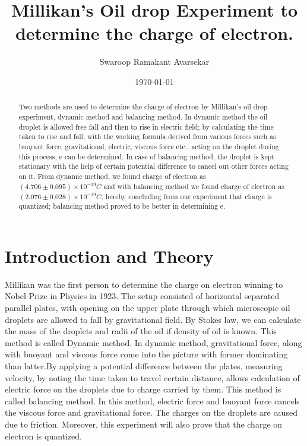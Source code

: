 \documentclass[a4paper, amsfonts, amssymb, amsmath, reprint, showkeys, nofootinbib, twoside]{revtex4-1}
\begin{document}
\title{Millikan's Oil drop Experiment to determine the charge of electron.}
\author{Swaroop Ramakant Avarsekar}
\date{\today}

	
\begin{abstract}
Two methods are used to determine the charge of electron by Millikan's oil drop experiment, dynamic method and balancing method. In dynamic method the oil droplet is allowed free fall and then to rise in electric field; by calculating the time taken to rise and fall, with the working formula derived from various forces such as buoyant force, gravitational, electric, viscous force etc.. acting on the droplet during this process, e can be determined. In case of balancing method, the droplet is kept stationary with the help of certain potential difference to cancel out other forces acting on it. From dynamic method, we found charge of electron as $(4.706\pm0.095)\times10^{-19} C$ and with balancing method we found charge of electron as $(2.076\pm0.028)\times10^{-19} C$, hereby concluding from our experiment that charge is quantized; balancing method proved to be better in determining e.
\end{abstract}
	
	
\maketitle

\section{Introduction and Theory}
Millikan was the first person to determine the charge on electron winning to Nobel Prize in Physics in 1923. The setup consisted of horizontal separated parallel plates, with opening on the upper plate through which microscopic oil droplets are allowed to fall by gravitational field. By Stokes law, we can calculate the mass of the droplets and radii of the oil if density of oil is known. This method is called Dynamic method. In dynamic method, gravitational force, along with buoyant and viscous force come into the picture with former dominating than latter.By applying a potential difference between the plates, measuring velocity, by noting the time taken to travel certain distance, allows calculation of electric force on the droplets due to charge carried by them. This method is called balancing method. In this method, electric force and buoyant force cancels the viscous force and gravitational force. The charges on the droplets are caused due to friction. Moreover, this experiment will also prove that the charge on electron is quantized.  
\end{document}
